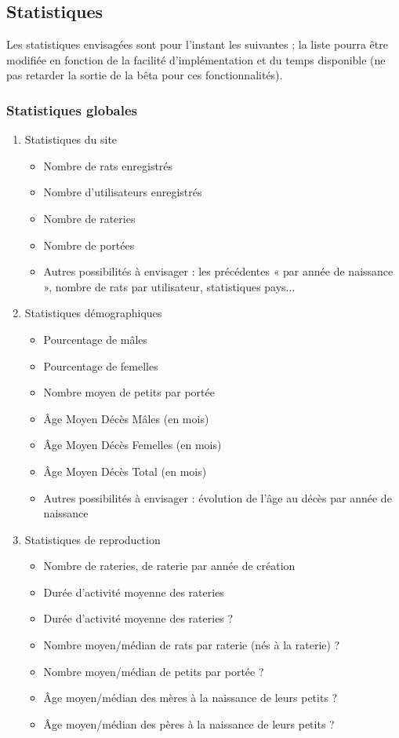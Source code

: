 \documentclass[a4paper,10pt]{article}
\begin{document}
\subsection{Statistiques}
\label{app:stats}

Les statistiques envisagées sont pour l'instant les suivantes ; la liste pourra être modifiée en fonction de la facilité d'implémentation et du temps disponible (ne pas retarder la sortie de la bêta pour ces fonctionnalités).

\subsubsection{Statistiques globales}
 
\begin{enumerate}
\item Statistiques du site
\begin{itemize}
\item Nombre de rats enregistrés
\item Nombre d'utilisateurs enregistrés
\item Nombre de rateries
\item Nombre de portées
\item Autres possibilités à envisager : les précédentes « par année de naissance », nombre de rats par utilisateur, statistiques pays...
\end{itemize}

\item Statistiques démographiques
\begin{itemize}
\item Pourcentage de mâles
\item Pourcentage de femelles
\item Nombre moyen de petits par portée
\item Âge Moyen Décès Mâles (en mois)
\item Âge Moyen Décès Femelles (en mois)
\item Âge Moyen Décès Total (en mois)
\item Autres possibilités à envisager : évolution de l'âge au décès par année de naissance
\end{itemize}

\item Statistiques de reproduction
\begin{itemize}
\item Nombre de rateries, de raterie par année de création
\item Durée d'activité moyenne des rateries
\item Durée d'activité moyenne des rateries ?
\item Nombre moyen/médian de rats par raterie (nés à la raterie) ?
\item Nombre moyen/médian de petits par portée ?
\item Âge moyen/médian des mères à la naissance de leurs petits ?
\item Âge moyen/médian des pères à la naissance de leurs petits ?
\end{itemize}


\end{enumerate}
\end{document}
